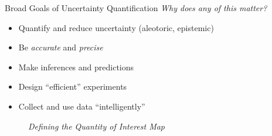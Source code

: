 \begin{frame}[t]{Broad Goals of Uncertainty Quantification}
\centering
    \emph{Why does any of this matter?}
	\vskip 20pt

    \begin{itemize}
        \item Quantify and reduce uncertainty (aleotoric, epistemic)
	    \vskip 20pt
	    \item Be \emph{accurate} and \emph{precise}
	    \vskip 20pt
	    \item Make inferences and predictions
	    \vskip 20pt
	    \item Design ``efficient'' experiments
	    \vskip 20pt
	    \item Collect and use data ``intelligently''
    \end{itemize}
    
\end{frame}

\begin{frame}[t]
\centering
\begin{figure}
\centering


\vspace{1em}
\emph{Defining the Quantity of Interest Map}
\end{figure}

\end{frame}


